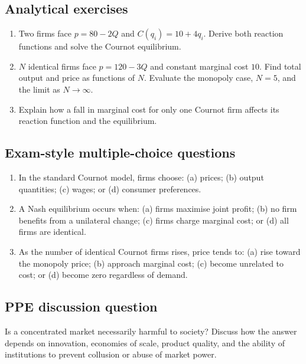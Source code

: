 \subsection*{Analytical exercises}
\begin{enumerate}[resume,label=\arabic*.]
  \item Two firms face $p=80-2Q$ and $C(q_i)=10+4q_i$. Derive both reaction functions and solve the Cournot equilibrium.
  \item $N$ identical firms face $p=120-3Q$ and constant marginal cost $10$. Find total output and price as functions of $N$. Evaluate the monopoly case, $N=5$, and the limit as $N\to\infty$.
  \item Explain how a fall in marginal cost for only one Cournot firm affects its reaction function and the equilibrium.
\end{enumerate}

\subsection*{Exam-style multiple-choice questions}
\begin{enumerate}[resume,label=\arabic*.]
  \item In the standard Cournot model, firms choose: (a) prices; (b) output quantities; (c) wages; or (d) consumer preferences.
  \item A Nash equilibrium occurs when: (a) firms maximise joint profit; (b) no firm benefits from a unilateral change; (c) firms charge marginal cost; or (d) all firms are identical.
  \item As the number of identical Cournot firms rises, price tends to: (a) rise toward the monopoly price; (b) approach marginal cost; (c) become unrelated to cost; or (d) become zero regardless of demand.
\end{enumerate}

\subsection*{PPE discussion question}

\noindent Is a concentrated market necessarily harmful to society? Discuss how
the answer depends on innovation, economies of scale, product quality, and the
ability of institutions to prevent collusion or abuse of market power.
